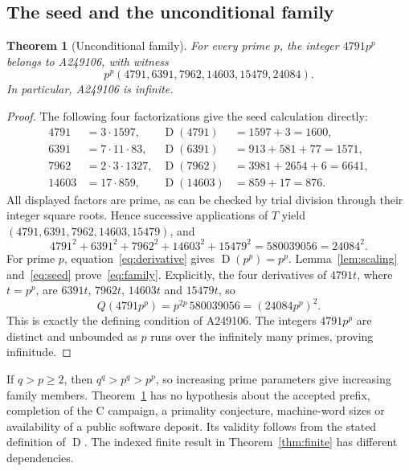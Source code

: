 \documentclass[11pt,a4paper]{article}
\newtheorem{theorem}{Theorem}
\theoremstyle{remark}
\newcommand{\D}{\operatorname{D}}
\begin{document}
\subsection{The seed and the unconditional family}
\begin{theorem}[Unconditional family]\label{thm:family}
For every prime $p$, the integer $4791p^p$ belongs to A249106, with witness
\begin{equation}\label{eq:family}
p^p(4791,6391,7962,14603,15479,24084).
\end{equation}
In particular, A249106 is infinite.
\end{theorem}
\begin{proof}
The following four factorizations give the seed calculation directly:
\begin{align*}
4791&=3\cdot1597, &\D(4791)&=1597+3=1600,\\
6391&=7\cdot11\cdot83, &\D(6391)&=913+581+77=1571,\\
7962&=2\cdot3\cdot1327, &\D(7962)&=3981+2654+6=6641,\\
14603&=17\cdot859, &\D(14603)&=859+17=876.
\end{align*}
All displayed factors are prime, as can be checked by trial division through
their integer square roots. Hence successive applications of $T$ yield
$(4791,6391,7962,14603,15479)$, and
\begin{equation}\label{eq:seed}
4791^2+6391^2+7962^2+14603^2+15479^2=580039056=24084^2.
\end{equation}
For prime $p$, equation~\eqref{eq:derivative} gives $\D(p^p)=p^p$.
Lemma~\ref{lem:scaling} and~\eqref{eq:seed} prove~\eqref{eq:family}.
Explicitly, the four derivatives of $4791t$, where $t=p^p$, are
$6391t$, $7962t$, $14603t$ and $15479t$, so
\[
 Q(4791p^p)=p^{2p}\,580039056=(24084p^p)^2.
\]
This is exactly the defining condition of A249106.
The integers $4791p^p$ are distinct and unbounded as $p$ runs over the
infinitely many primes, proving infinitude.
\end{proof}

If $q>p\ge2$, then $q^q>p^q>p^p$, so increasing prime parameters
give increasing family members.
Theorem~\ref{thm:family} has no hypothesis about the accepted prefix,
completion of the C campaign, a primality conjecture, machine-word sizes
or availability of a public software deposit. Its validity follows from
the stated definition of $\D$. The indexed finite result in
Theorem~\ref{thm:finite} has different dependencies.
\end{document}
